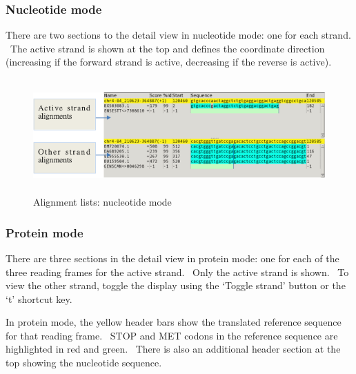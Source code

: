 \documentclass[letterpaper]{article}
\begin{document}
\bigskip

{\color[rgb]{0.30980393,0.5058824,0.7411765}\subsubsection[Nucleotide mode]{Nucleotide mode}}
\hypertarget{RefHeading1721056909880}{}{
There are two sections to the detail view in nucleotide mode: one for
each strand. \ The active strand is shown at the top and defines the
coordinate direction (increasing if the forward strand is active,
decreasing if the reverse is active).}

\begin{figure}
\centering
\color[rgb]{0.30980393,0.5058824,0.7411765}
\includegraphics[width=14.933cm,height=4.353cm]{img_view_alignment_details_nucleotide.png}
\caption{Alignment lists: nucleotide mode}
\end{figure}

\bigskip

{\color[rgb]{0.30980393,0.5058824,0.7411765}\subsubsection[Protein mode]{Protein mode}}
\hypertarget{RefHeading1741056909880}{}{
There are three sections in the detail view in protein mode: one for
each of the three reading frames for the active strand. \ Only the
active strand is shown. \ To view the other strand, toggle the display
using the {\textquoteleft}Toggle strand{\textquoteright} button or the
{\textquoteleft}t{\textquoteright} shortcut key.}

\bigskip

{In protein mode, the yellow header bars show the translated reference
sequence for that reading frame. \ STOP and MET codons in the reference
sequence are highlighted in red and green. \ There is also an
additional header section at the top showing the nucleotide sequence.}
\end{document}
